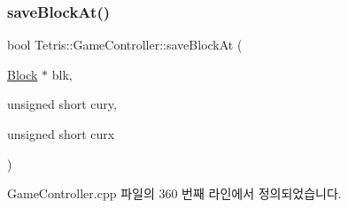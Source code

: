\mbox{\label{class_tetris_1_1_game_controller_adc067380df0f0da4ea4a358d00d6a123}} 
\subsubsection{\texorpdfstring{save\+Block\+At()}{saveBlockAt()}\hspace{0.1cm}{\footnotesize\ttfamily [1/2]}}
{\footnotesize\ttfamily bool Tetris\+::\+Game\+Controller\+::save\+Block\+At (\begin{DoxyParamCaption}\item[{\hyperlink{class_tetris_1_1_block}{Block} $\ast$}]{blk,  }\item[{unsigned short}]{cury,  }\item[{unsigned short}]{curx }\end{DoxyParamCaption})\hspace{0.3cm}{\ttfamily [protected]}}



Game\+Controller.\+cpp 파일의 360 번째 라인에서 정의되었습니다.


